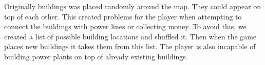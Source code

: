 	Originally buildings was placed randomly around the map. They could appear
	on top of each other. This created problems for the player when attempting
	to connect the buildings with power lines or collecting money. To avoid
	this, we created a list of possible building locations and shuffled it. Then
	when the game places new buildings it takes them from this list. The player
	is also incapable of building power plants on top of already existing
	buildings.
	
\begin{figure}[H]
	\centering
\end{figure}
